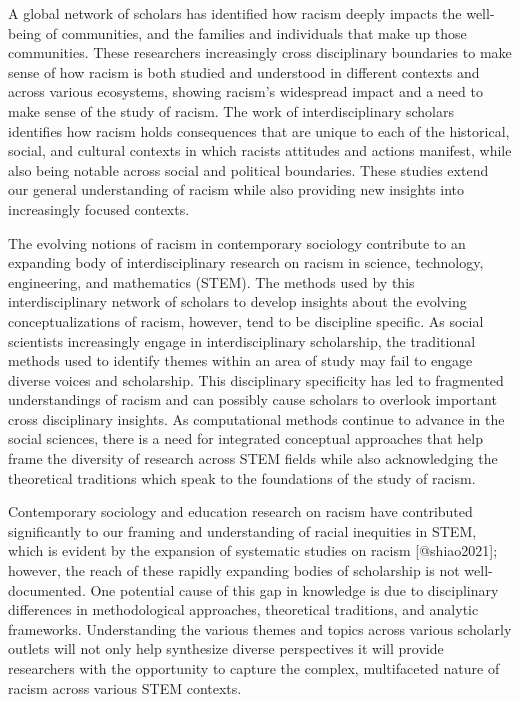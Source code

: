 

A global network of scholars has identified how racism deeply impacts the well-being of communities, and the families and individuals that make up those communities. 
These researchers increasingly cross disciplinary boundaries to make sense of how racism is both studied and understood in different contexts and across various ecosystems, showing racism's widespread impact and a need to make sense of the study of racism. 
The work of interdisciplinary scholars identifies how racism holds consequences that are unique to each of the historical, social, and cultural contexts in which racists attitudes and actions manifest, while also being notable across social and political boundaries.
These studies extend our general understanding of racism while also providing new insights into increasingly focused contexts.

The evolving notions of racism in contemporary sociology contribute to an expanding body of interdisciplinary research on racism in science, technology, engineering, and mathematics (STEM).
The methods used by this interdisciplinary network of scholars to develop insights about the evolving conceptualizations of racism, however, tend to be discipline specific.
As social scientists increasingly engage in interdisciplinary scholarship, the traditional methods used to identify themes within an area of study may fail to engage diverse voices and scholarship.
This disciplinary specificity has led to fragmented understandings of racism and can possibly cause scholars to overlook important cross disciplinary insights.
As computational methods continue to advance in the social sciences, there is a need for  integrated conceptual approaches that help frame the diversity of research across STEM fields while also acknowledging the theoretical traditions which speak to the foundations of the study of racism.


Contemporary sociology and education research on racism have contributed significantly to our framing and understanding of racial inequities in STEM, which is evident by the expansion of systematic studies on racism [@shiao2021]; however, the reach of these rapidly expanding bodies of scholarship is not well-documented.
One potential cause of this gap in knowledge is due to disciplinary differences in methodological approaches, theoretical traditions, and analytic frameworks.
Understanding the various themes and topics across various scholarly outlets will not only help synthesize diverse perspectives it will provide researchers with the opportunity to capture the complex, multifaceted nature of racism across various STEM contexts.


